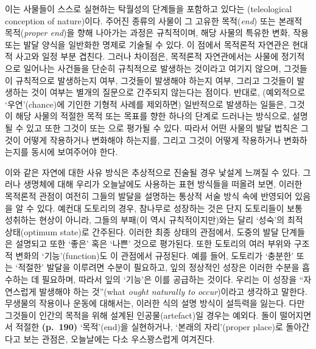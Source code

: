 이는 사물들이 스스로 실현하는 탁월성의 단계들을 포함하고 있다는
(teleological conception of nature)이다. 주어진
종류의 사물이 그 고유한 목적(\emph{end}) 또는 본래적 목적(\emph{proper
end})을 향해 나아가는 과정은 규칙적이며, 해당 사물의 특유한 변화, 작용
또는 발달 양식을 일반화한 명제로 기술될 수 있다. 이 점에서 목적론적
자연관은 현대적 사고와 일정 부분 겹친다. 그러나 차이점은, 목적론적
자연관에서는 사물에 정기적으로 일어나는 사건들을 단순히 규칙적으로
발생하는 것이라고 여기지 않으며, 그것들이  규칙적으로
발생하는지 여부, 그것들이  발생해야 하는지 여부, 그리고
그것들이 발생하는 것이  여부는 별개의 질문으로
간주되지 않는다는 점이다. 반대로, (예외적으로 `우연'(chance)에 기인한
기형적 사례를 제외하면) 일반적으로 발생하는 일들은, 그것이 해당 사물의
적절한 목적 또는 목표를 향한 하나의 단계로 드러나는 방식으로, 설명될 수
있고 또한 그것이  또는 으로
평가될 수 있다. 따라서 어떤 사물의 발달 법칙은 그것이 
어떻게 작용하거나 변화해야 하는지를, 그리고 그것이  어떻게
작용하거나 변화하는지를 동시에 보여주어야 한다.

이와 같은 자연에 대한 사유 방식은 추상적으로 진술될 경우 낯설게 느껴질
수 있다. 그러나 생명체에 대해 우리가 오늘날에도 사용하는 표현 방식들을
떠올려 보면, 이러한 목적론적 관점이 여전히 그들의 발달을 설명하는 통상적
서술 방식 속에 반영되어 있음을 알 수 있다. 예컨대 도토리의 경우,
참나무로 성장하는 것은 단지 도토리들이 보통 성취하는 현상이 아니라,
그들의 부패(이 역시 규칙적이지만)와는 달리 `성숙'의 최적 상태(optimum
state)로 간주된다. 이러한 최종 상태의 관점에서, 도중의 발달 단계들은
설명되고 또한 `좋은' 혹은 `나쁜' 것으로 평가된다. 또한 도토리의 여러
부위와 구조적 변화의 `기능'(function)도 이 관점에서 규정된다. 예를 들어,
도토리가 `충분한' 또는 `적절한' 발달을 이루려면 수분이 필요하고, 잎의
정상적인 성장은 이러한 수분을 흡수하는 데 필요하며, 따라서 잎의 `기능'은
이를 공급하는 것이다. 우리는 이 성장을 ``자연스럽게 발생해야 하는
것''(what \emph{ought naturally to occur})이라고 생각하고 말한다.
무생물의 작용이나 운동에 대해서는, 이러한 식의 설명 방식이 설득력을
잃는다. 다만 그것들이 인간의 목적을 위해 설계된 인공물(artefact)일
경우는 예외다. 돌이 떨어지면서 적절한 \textbf{(p.~190)} `목적'(end)을
실현하거나, `본래의 자리'(proper place)로 돌아간다고 보는 관점은,
오늘날에는 다소 우스꽝스럽게 여겨진다.

